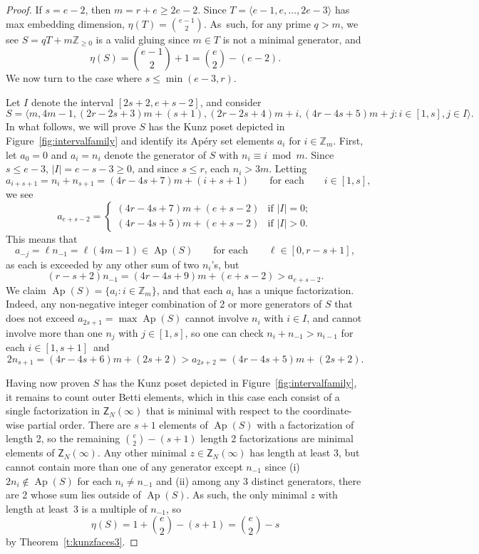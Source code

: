 \documentclass[ALCO]{cedram}
\newcommand\ZZ{\mathbb{Z}}
\DeclareMathOperator\Ap{Ap}
\begin{document}
\begin{proof}
If $s = e - 2$, then $m = r + e \ge 2e - 2$.  Since $T = \langle e-1, e, \ldots, 2e - 3 \rangle$ has max embedding dimension, $\eta(T) = \binom{e-1}{2}$.  As~such, for any prime $q > m$, we see $S = qT + m\ZZ_{\ge 0}$ is a valid gluing since $m \in T$ is not a minimal generator, and
$$\eta(S) = \binom{e-1}{2} + 1 = \binom{e}{2} - (e - 2).$$
We now turn to the case where $s \le \min(e-3, r)$.  

Let $I$ denote the interval $[2s+2, e+s-2]$, and consider
{\small \[ S = \langle m, 4m - 1, (2r - 2s + 3)m + (s + 1), (2r - 2s + 4)m + i, (4r - 4s + 5)m + j : i \in [1, s], j \in I  \rangle. \]}In what follows, we will prove $S$ has the Kunz poset depicted in Figure~\ref{fig:intervalfamily} and identify its Ap\'ery set elements $a_i$ for $i \in \ZZ_m$.  
First, let $a_0 = 0$ and $a_i = n_i$ denote the generator of $S$ with $n_i \equiv i \bmod m$.  
Since $s \le e - 3$, $|I| = e - s - 3 \ge 0$, and since $s \le r$, each $n_i > 3m$.  
Letting 
$$
a_{i+s+1} = n_i + n_{s+1} = (4r - 4s + 7)m + (i+s+1)
\qquad \text{for each} \qquad
i \in [1, s],
$$
we see 
$$a_{e+s-2} = \begin{cases}
(4r - 4s + 7)m + (e + s - 2) & \text{if } |I| = 0; \\
(4r - 4s + 5)m + (e + s - 2) & \text{if } |I| > 0.
\end{cases}$$
This means that
$$a_{-j} = \ell n_{-1} = \ell(4m - 1) \in \Ap(S)
\qquad \text{for each} \qquad
\ell \in [0, r - s + 1],$$
as each is exceeded by any other sum of two $n_i$'s, but 
$$(r - s + 2)n_{-1} = (4r - 4s + 9)m + (e + s - 2) > a_{e+s-2}.$$
We claim $\Ap(S) = \{a_i : i \in \ZZ_m\}$, and that each $a_i$ has a unique factorization.  Indeed, any non-negative integer combination of 2 or more generators of $S$ that does not exceed $a_{2s+1} = \max \Ap(S)$ cannot involve $n_i$ with $i \in I$, and cannot involve more than one $n_j$ with $j \in [1,s]$, so one can check $n_i + n_{-1} > n_{i-1}$ for each $i \in [1,s+1]$~and 
$$2n_{s+1} = (4r - 4s + 6)m + (2s + 2) > a_{2s+2} = (4r - 4s + 5)m + (2s + 2).$$

Having now proven $S$ has the Kunz poset depicted in Figure~\ref{fig:intervalfamily}, it remains to count outer Betti elements, which in this case each consist of a single factorization in $\mathsf Z_N(\infty)$ that is minimal with respect to the coordinate-wise partial order.  There are $s + 1$ elements of $\Ap(S)$ with a factorization of length 2, so the remaining $\binom{e}{2} - (s + 1)$ length 2 factorizations are minimal elements of $\mathsf Z_N(\infty)$.  Any other minimal $z \in \mathsf Z_N(\infty)$ has length at least 3, but cannot contain more than one of any generator except $n_{-1}$ since (i) $2n_i \notin \Ap(S)$ for each $n_i \ne n_{-1}$ and (ii) among any 3 distinct generators, there are 2 whose sum lies outside of $\Ap(S)$.  As such, the only minimal $z$ with length at least~3 is a multiple of $n_{-1}$, so
$$\eta(S) = 1 + \binom{e}{2} - (s + 1) = \binom{e}{2} - s$$
by Theorem~\ref{t:kunzfaces3}.  
\end{proof}
\end{document}
